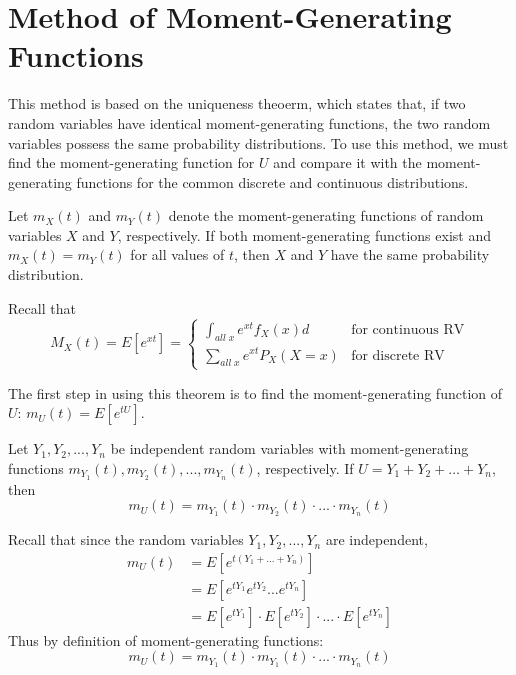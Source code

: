 \documentclass[12pt, a4paper, twoside, openright, titlepage]{book}
\begin{document}
\section{\textsection Method of Moment-Generating Functions}

\begin{rmk}{}{}
    This method is based on the uniqueness theoerm, which states that, if two random variables have identical moment-generating functions, the two random variables possess the same probability distributions. To use this method, we must find the moment-generating function for $U$ and compare it with the moment-generating functions for the common discrete and continuous distributions.
\end{rmk}

\begin{thm}{}{}
    Let $m_X(t)$ and $m_Y(t)$ denote the moment-generating functions of random variables $X$ and $Y$, respectively. If both moment-generating functions exist and $m_X(t) = m_Y(t)$ for all values of $t$, then $X$ and $Y$ have the same probability distribution.
\end{thm}

\begin{rec}{}{}
    Recall that \begin{equation*}
        M_X(t) = E[e^{xt}] = \left\{\begin{array}{lc} \int_{all\;x}e^{xt}f_X(x)d & \text{for continuous RV} \\ \sum_{all\;x}e^{xt}P_X(X=x) & \text{for discrete RV} \end{array}\right.
    \end{equation*}
\end{rec}




The first step in using this theorem is to find the moment-generating function of $U$: $m_U(t) = E[e^{tU}]$.

\begin{thm}{}{}
    Let $Y_1,Y_2,...,Y_n$ be independent random variables with moment-generating functions $m_{Y_1}(t),m_{Y_2}(t),...,m_{Y_n}(t)$, respectively. If $U = Y_1 + Y_2 + \hdots + Y_n$, then \begin{equation*}
        m_U(t) = m_{Y_1}(t)\cdot m_{Y_2}(t)\cdot ... \cdot m_{Y_n}(t)
    \end{equation*}
\end{thm}
\begin{proof*}{}{}
    Recall that since the random variables $Y_1,Y_2,...,Y_n$ are independent, \begin{align*}
        m_U(t) &= E[e^{t(Y_1+...+Y_n)}] \\
        &= E[e^{tY_1}e^{tY_2}...e^{tY_n}] \\
        &= E[e^{tY_1}]\cdot E[e^{tY_2}] \cdot ... \cdot E[e^{tY_n}]
    \end{align*}
    Thus by definition of moment-generating functions:\begin{equation*}
        m_U(t) = m_{Y_1}(t)\cdot m_{Y_1}(t)\cdot ... \cdot m_{Y_n}(t)
    \end{equation*}
\end{proof*}
\end{document}

